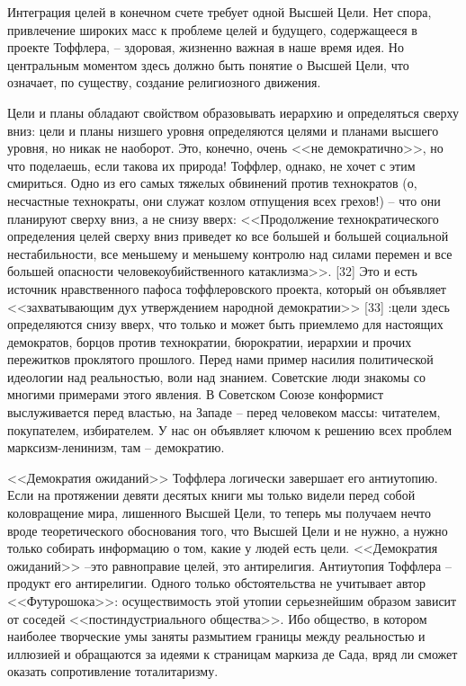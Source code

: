 \documentclass{book}
\begin{document}
Интеграция целей в конечном счете требует одной Высшей Цели. Нет спора, привлечение широких масс к проблеме целей и будущего, содержащееся в проекте Тоффлера, -- здоровая, жизненно важная в наше время идея. Но центральным момен­том здесь должно быть понятие о Высшей Цели, что означает, по существу, создание религиозного движения.

Цели и планы обладают свойством образовывать иерархию и определяться сверху вниз: цели и планы низшего уровня определяются целями и планами высшего уровня, но никак не наоборот. Это, конечно, очень <<не демократично>>, но что поде­лаешь, если такова их природа! Тоффлер, однако, не хочет с этим смириться. Одно из его самых тяжелых обвинений против технократов (о, несчастные технократы, они служат козлом отпущения всех грехов!) -- что они планируют сверху вниз, а не снизу вверх: <<Продолжение технократического определения целей сверху вниз приведет ко все большей и большей социаль­ной нестабильности, все меньшему и меньшему контролю над си­лами перемен и все большей опасности человекоубийственного катаклизма>>. [32] Это и есть источник нравственного пафоса тоффлеровского проекта, который он объявляет <<захватыва­ющим дух утверждением народной демократии>> [33] :цели здесь определяются снизу вверх, что только и может быть приемлемо для настоящих демократов, борцов против технократии, бю­рократии, иерархии и 
прочих 
пережитков проклятого прошлого. Перед нами пример насилия политической идеологии над реаль­ностью, воли над знанием. Советские люди знакомы со многи­ми примерами этого явления. В Советском Союзе конформист выслуживается перед властью, на Западе -- перед человеком мас­сы: читателем, покупателем, избирателем. У нас он объявляет ключом к решению всех проблем марксизм-ленинизм, там -- демократию.

<<Демократия ожиданий>> Тоффлера логически завершает его антиутопию. Если на протяжении девяти десятых книги мы только видели перед собой коловращение мира, лишенного Высшей Цели, то теперь мы получаем нечто вроде теоретиче­ского обоснования того, что Высшей Цели и не нужно, а нужно только собирать информацию о том, какие у людей есть  цели. <<Демократия ожиданий>> --это равноправие целей, это анти­религия. Антиутопия Тоффлера -- продукт его антирелигии. Одного только обстоятельства не учитывает автор <<Футурошока>>: осуществимость этой утопии серьезнейшим образом за­висит от соседей <<постиндустриального общества>>. Ибо общест­во, в котором наиболее творческие умы заняты размытием гра­ницы между реальностью и иллюзией и обращаются за идеями к страницам маркиза де Сада, вряд ли сможет оказать сопротив­ление тоталитаризму.
\end{document}
